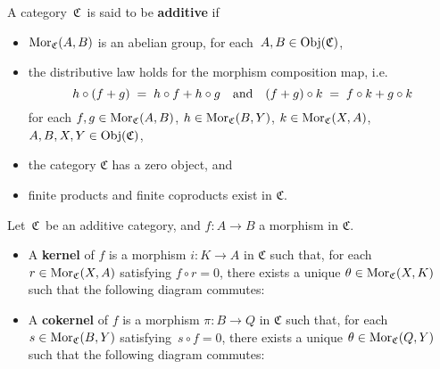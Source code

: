 
\vskip 0.5cm
\begin{definition}
\mbox{}
\vskip 0.15cm
\noindent
A category \,$\mathfrak{C}$\, is said to be \textbf{additive} if
\begin{itemize}
\item
	$\textnormal{Mor}_{\mathfrak{C}}(A,B)$ is an abelian group, for each \,$A, B \in \textnormal{Obj}(\mathfrak{C})$,
\item
	the distributive law holds for the morphism composition map, i.e.
	\begin{equation*}
	h \circ (f + g) \; = \; h \circ f + h \circ g
	\quad\textnormal{and}\quad
	(f + g) \circ k \; = \; f \circ k + g \circ k
	\end{equation*}
	for each
	$f, g \in \textnormal{Mor}_{\mathfrak{C}}(A,B)$,
	$h \in \textnormal{Mor}_{\mathfrak{C}}(B,Y)$,
	$k \in \textnormal{Mor}_{\mathfrak{C}}(X,A)$,
	$A, B, X, Y \in \textnormal{Obj}(\mathfrak{C})$,
\item
	the category $\mathfrak{C}$ has a zero object, and
\item
	finite products and finite coproducts exist in $\mathfrak{C}$.
\end{itemize}
\end{definition}


\vskip 0.5cm
\begin{definition}
\mbox{}
\vskip 0.15cm
\noindent
Let \,$\mathfrak{C}$\, be an additive category, and $f : A \longrightarrow B$ a morphism in $\mathfrak{C}$.
\begin{itemize}
\item
	A \textbf{kernel} of $f$ is a morphism $i : K \longrightarrow A$ in $\mathfrak{C}$ such that,
	for each $r \in \textnormal{Mor}_{\mathfrak{C}}(X,A)$ satisfying $f \circ r = 0$,
	there exists a unique $\theta \in \textnormal{Mor}_{\mathfrak{C}}(X,K)$ such that the following diagram commutes:
	\begin{center}
	\end{center}
\item
	A \textbf{cokernel} of $f$ is a morphism $\pi : B \longrightarrow Q$ in $\mathfrak{C}$ such that,
	for each $s \in \textnormal{Mor}_{\mathfrak{C}}(B,Y)$ satisfying \,$s \circ f = 0$,
	there exists a unique $\theta \in \textnormal{Mor}_{\mathfrak{C}}(Q,Y)$ such that the following diagram commutes:
	\begin{center}
	\end{center}
\end{itemize}
\end{definition}

